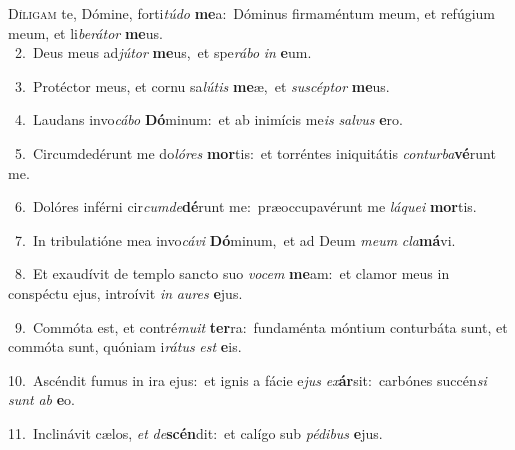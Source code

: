 \lettrine{\initial\textcolor{\initialcolor}{D}}{íligam} te, Dómine, forti\-\textit{tú}\-\textit{do} \textbf{me}\-a:~\star Dóminus firmaméntum meum, et refúgium meum, et li\-\textit{be}\-\textit{rá}\textit{tor} \textbf{me}\-us.\\
{\numbfont\textcolor{\numbcolor}{~2.}}~Deus meus ad\-\textit{jú}\-\textit{tor} \textbf{me}\-us,~\star et spe\-\textit{rá}\-\textit{bo} \textit{in} \textbf{e}\-um.\par
{\numbfont\textcolor{\numbcolor}{~3.}}~Protéctor meus, et cornu sa\-\textit{lú}\-\textit{tis} \textbf{me}\-æ,~\star et \textit{su}\-\textit{scép}\textit{tor} \textbf{me}\-us.\par
{\numbfont\textcolor{\numbcolor}{~4.}}~Laudans invo\-\textit{cá}\-\textit{bo} \textbf{Dó}\-minum:~\star et ab inimícis me\textit{is} \textit{sal}\-\textit{vus} \textbf{e}\-ro.\par
{\numbfont\textcolor{\numbcolor}{~5.}}~Circumdedérunt me do\-\textit{ló}\-\textit{res} \textbf{mor}\-tis:~\star et torréntes iniquitátis \textit{con}\-\textit{tur}\textit{ba}\textbf{vé}runt me.\par
{\numbfont\textcolor{\numbcolor}{~6.}}~Dolóres inférni cir\-\textit{cum}\-\textit{de}\textbf{dé}runt me:~\star præoccupavérunt me \textit{lá}\-\textit{que}\textit{i} \textbf{mor}\-tis.\par
{\numbfont\textcolor{\numbcolor}{~7.}}~In tribulatióne mea invo\-\textit{cá}\-\textit{vi} \textbf{Dó}\-minum,~\star et ad Deum \textit{me}\-\textit{um} \textit{cla}\-\textbf{má}vi.\par
{\numbfont\textcolor{\numbcolor}{~8.}}~Et exaudívit de templo sancto suo \textit{vo}\-\textit{cem} \textbf{me}\-am:~\star et clamor meus in conspéctu ejus, introívit \textit{in} \textit{au}\-\textit{res} \textbf{e}\-jus.\par
{\numbfont\textcolor{\numbcolor}{~9.}}~Commóta est, et contré\-\textit{mu}\-\textit{it} \textbf{ter}\-ra:~\star fundaménta móntium conturbáta sunt, et commóta sunt, quóniam i\-\textit{rá}\-\textit{tus} \textit{est} \textbf{e}\-is.\par
{\numbfont\textcolor{\numbcolor}{10.}}~Ascéndit fumus in ira ejus:~\dagger et ignis a fácie e\textit{jus} \textit{ex}\-\textbf{ár}sit:~\star carbónes succén\textit{si} \textit{sunt} \textit{ab} \textbf{e}\-o.\par
{\numbfont\textcolor{\numbcolor}{11.}}~Inclinávit cælos, \textit{et} \textit{de}\-\textbf{scén}dit:~\star et calígo sub \textit{pé}\-\textit{di}\textit{bus} \textbf{e}\-jus.\par
